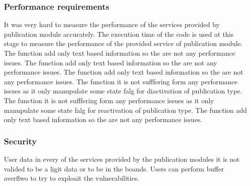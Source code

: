\subsubsection{Performance requirements}
It was very hard to measure the performance of the services provided by publication module accurately. The execution time of the code is used at this stage to measure the performance of the provided service of publication module.
 The function add only text based information so the are not any performance issues.
 The function add only text based information so the are not any performance issues.
 The function add only text based information so the are not any performance issues.
 The function it is not sufffering form any performance issues as it only manupulate some state falg for diactivation of publication type.
 The function it is not sufffering form any performance issues as it only manupulate some state falg for reactivation of publication type.
 The function add only text based information so the are not any performance issues.

\subsubsection{Security}
User data in every of the services provided by the publication modules it is not valided to be a ligit data or to be in the boands. Users can perform buffer averflwo to try to exploait the vulnerabilities.
